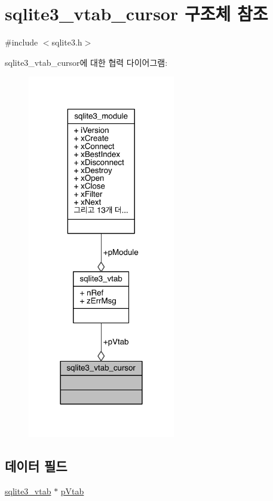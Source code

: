 \hypertarget{structsqlite3__vtab__cursor}{}\section{sqlite3\+\_\+vtab\+\_\+cursor 구조체 참조}
\label{structsqlite3__vtab__cursor}


{\ttfamily \#include $<$sqlite3.\+h$>$}



sqlite3\+\_\+vtab\+\_\+cursor에 대한 협력 다이어그램\+:
\nopagebreak
\begin{figure}[H]
\begin{center}
\leavevmode
\includegraphics[width=182pt]{d9/d33/structsqlite3__vtab__cursor__coll__graph}
\end{center}
\end{figure}
\subsection*{데이터 필드}
\begin{DoxyCompactItemize}
\item 
\hyperlink{structsqlite3__vtab}{sqlite3\+\_\+vtab} $\ast$ \hyperlink{structsqlite3__vtab__cursor_a2989d9f84a35506c3ef9fe9e9ecd3365}{p\+Vtab}
\end{DoxyCompactItemize}


